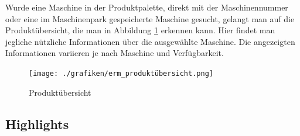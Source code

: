 Wurde eine Maschine in der Produktpalette, direkt mit der Maschinennummer oder eine im Maschinenpark gespeicherte Maschine gesucht, gelangt man auf die Produktübersicht, die man in Abbildung \ref{fig:produktübersicht} erkennen kann. Hier findet man jegliche nützliche Informationen über die ausgewählte Maschine. Die angezeigten Informationen variieren je nach Maschine und Verfügbarkeit.

\begin{figure}[H]
	\centerline{
		\texttt{[image: ./grafiken/erm\_produktübersicht.png]}
	}
	\vskip0pt
	\caption{Produktübersicht} \label{fig:produktübersicht}
\end{figure}

\subsection{Highlights}

